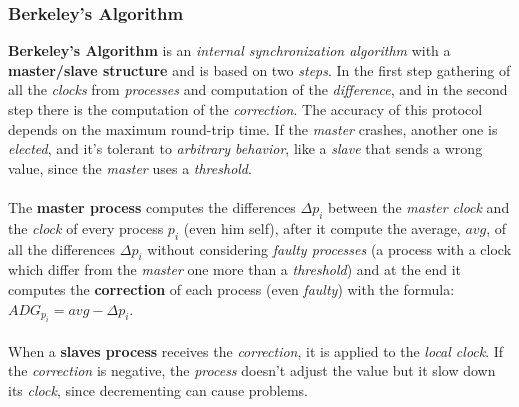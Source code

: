\documentclass{article}
\begin{document}
\subsubsection{Berkeley's Algorithm}
\textbf{Berkeley's Algorithm} is an \emph{internal synchronization algorithm} with a \textbf{master/slave structure} and is based on two \emph{steps}. In the first step gathering of all the \emph{clocks} from \emph{processes} and computation of the \emph{difference}, and in the second step there is the computation of the \emph{correction}. The accuracy of this protocol depends on the maximum round-trip time. If the \emph{master} crashes, another one is \emph{elected}, and it's tolerant to \emph{arbitrary behavior}, like a \emph{slave} that sends a wrong value, since the \emph{master} uses a \emph{threshold}. \\\\
The \textbf{master process} computes the differences $\Delta p_i$ between the\emph{ master clock} and the \emph{clock} of every process $p_i$ (even him self), after it compute the average, $avg$, of all the differences $\Delta p_i$ without considering \emph{faulty processes} (a process with a clock which differ from the \emph{master} one more than a \emph{threshold}) and at the end it computes the \textbf{correction} of each process (even \emph{faulty}) with the formula: $ADG_{p_i} = avg - \Delta p_i$. \\\\
When a \textbf{slaves process} receives the \emph{correction}, it is applied to the \emph{local clock}. If the \emph{correction} is negative, the \emph{process} doesn't adjust the value but it slow down its \emph{clock}, since decrementing can cause problems.
\end{document}
